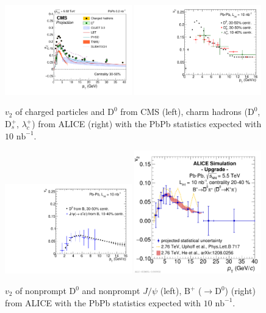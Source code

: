 \begin{figure}[ht]
  \begin{center}
    \includegraphics[width=0.49\textwidth]{hf/figures/cV2_lumiMB_0_wTheory_right.pdf}
    \includegraphics[width=0.49\textwidth]{hf/figures/D0DsLc_v2_TDR.pdf}
    \caption{$v_{2}$ of charged particles and $\mathrm{D}^{0}$ from CMS (left), charm hadrons ($\mathrm{D}^{0}$, $\mathrm{D}_{s}^{+}$, $\lambda_{c}^{+}$) from ALICE (right) with the PbPb statistics expected with $10$ $\mathrm{nb}^{-1}$.}
    \label{fig:RAAv2.v2charm}
  \end{center}
\end{figure}
\begin{figure}[ht]
  \begin{center}
    \includegraphics[width=0.49\textwidth]{hf/figures/D0fromB_JpsifromB_v2_TDR.pdf}
    \includegraphics[width=0.49\textwidth]{hf/figures/2016-Jun-10-PlotAllResults_v2FinalEstimate_20-40.pdf}
    \caption{$v_{2}$ of nonprompt $\mathrm{D}^{0}$ and nonprompt $J/\psi$ (left), $\mathrm{B}^{+}$ ($\rightarrow \mathrm{D}^{0}$) (right) from ALICE with the PbPb statistics expected with $10$ $\mathrm{nb}^{-1}$.}
    \label{fig:RAAv2.v2beauty}
  \end{center}
\end{figure}

